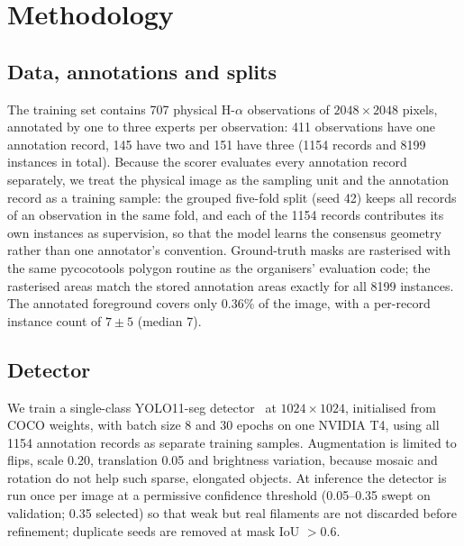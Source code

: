 \documentclass[sigconf]{acmart}
\begin{document}
\section{Methodology}

\subsection{Data, annotations and splits}
The training set contains 707 physical H-$\alpha$ observations of $2048\times2048$ pixels, annotated by one to three experts per observation: 411 observations have one annotation record, 145 have two and 151 have three (1154 records and 8199 instances in total).
Because the scorer evaluates every annotation record separately, we treat the physical image as the sampling unit and the annotation record as a training sample: the grouped five-fold split (seed 42) keeps all records of an observation in the same fold, and each of the 1154 records contributes its own instances as supervision, so that the model learns the consensus geometry rather than one annotator's convention.
Ground-truth masks are rasterised with the same pycocotools polygon routine as the organisers' evaluation code; the rasterised areas match the stored annotation areas exactly for all 8199 instances.
The annotated foreground covers only 0.36\% of the image, with a per-record instance count of $7\pm5$ (median 7).

\subsection{Detector}
We train a single-class YOLO11-seg detector~\cite{ultralytics} at $1024\times1024$, initialised from COCO weights, with batch size 8 and 30 epochs on one NVIDIA T4, using all 1154 annotation records as separate training samples.
Augmentation is limited to flips, scale 0.20, translation 0.05 and brightness variation, because mosaic and rotation do not help such sparse, elongated objects.
At inference the detector is run once per image at a permissive confidence threshold (0.05--0.35 swept on validation; 0.35 selected) so that weak but real filaments are not discarded before refinement; duplicate seeds are removed at mask IoU $>0.6$.
\end{document}
